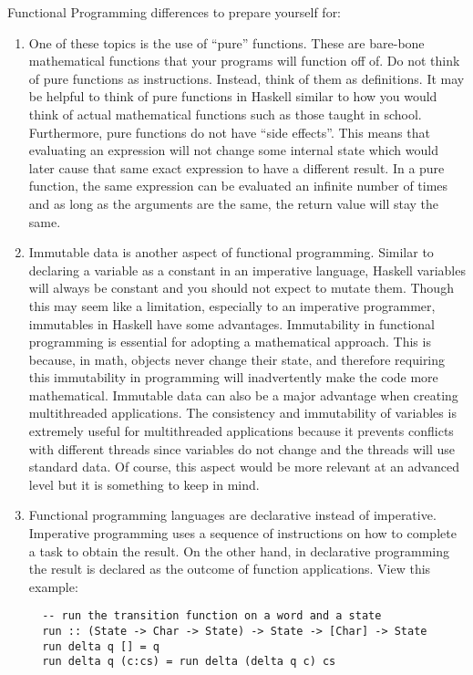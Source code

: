 \documentclass{article}
\begin{document}
\medskip\noindent
Functional Programming differences to prepare yourself for:
\begin{enumerate}
  \item One of these topics is the use of “pure” functions. These are bare-bone mathematical functions that your programs will function off of. Do not think of pure functions as instructions. Instead, think of them as definitions. It may be helpful to think of pure functions in Haskell similar to how you would think of actual mathematical functions such as those taught in school. Furthermore, pure functions do not have “side effects”. This means that evaluating an expression will not change some internal state which would later cause that same exact expression to have a different result. In a pure function, the same expression can be evaluated an infinite number of times and as long as the arguments are the same, the return value will stay the same.
  
  \item Immutable data is another aspect of functional programming. Similar to declaring a variable as a constant in an imperative language, Haskell variables will always be constant and you should not expect to mutate them. Though this may seem like a limitation, especially to an imperative programmer, immutables in Haskell have some advantages. Immutability in functional programming is essential for adopting a mathematical approach. This is because, in math, objects never change their state, and therefore requiring this immutability in programming will inadvertently make the code more mathematical. Immutable data can also be a major advantage when creating multithreaded applications. The consistency and immutability of variables is extremely useful for multithreaded applications because it prevents conflicts with different threads since variables do not change and the threads will use standard data. Of course, this aspect would be more relevant at an advanced level but it is something to keep in mind.
  
  \item Functional programming languages are declarative instead of imperative. Imperative programming uses a sequence of instructions on how to complete a task to obtain the result. On the other hand, in declarative programming the result is declared as the outcome of function applications. View this example:

  \begin{lstlisting}
  -- run the transition function on a word and a state
  run :: (State -> Char -> State) -> State -> [Char] -> State
  run delta q [] = q
  run delta q (c:cs) = run delta (delta q c) cs 
  \end{lstlisting}


\end{enumerate}
\end{document}
